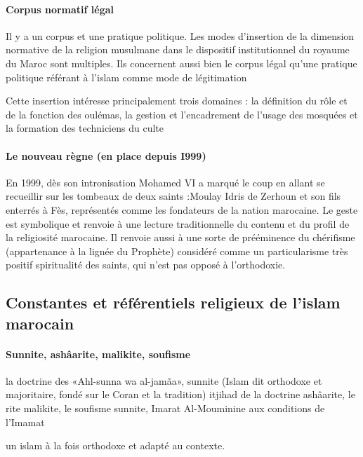 
\paragraph{Corpus normatif légal} Il y a un corpus et une pratique politique. 
Les modes d'insertion de la dimension normative de la religion musulmane dans le dispositif institutionnel du royaume du Maroc sont multiples.
Ils concernent aussi bien le corpus légal qu'une pratique politique référant à l'islam comme mode de légitimation 

Cette insertion intéresse principalement trois domaines : la définition du rôle et de la fonction des oulémas, la gestion et l'encadrement de l'usage des mosquées et la formation des techniciens du culte

\paragraph{Le nouveau règne (en place depuis I999)} En 1999,  dès son intronisation Mohamed VI a marqué le coup en allant se recueillir sur les tombeaux de deux saints :Moulay Idris de Zerhoun et son fils enterrés à Fès, représentés comme les fondateurs de la nation marocaine.
 Le geste est symbolique et renvoie à une lecture traditionnelle du contenu et du profil de la religiosité marocaine.
 Il renvoie aussi à une sorte de prééminence du chérifisme (appartenance à la lignée du Prophète) considéré comme un particularisme très positif
spiritualité des saints, qui n'est pas opposé à l'orthodoxie. 

\subsection{Constantes et référentiels religieux de l'islam marocain}

\paragraph{Sunnite, ashâarite, malikite, soufisme}
la doctrine des «Ahl-sunna wa al-jamãa»,  sunnite (Islam dit orthodoxe et majoritaire, fondé sur le Coran et la tradition) itjihad de la doctrine ashâarite, le rite malikite,  le soufisme sunnite,  Imarat Al-Mouminine aux conditions de l'Imamat

  un islam à la fois orthodoxe et adapté au contexte.
